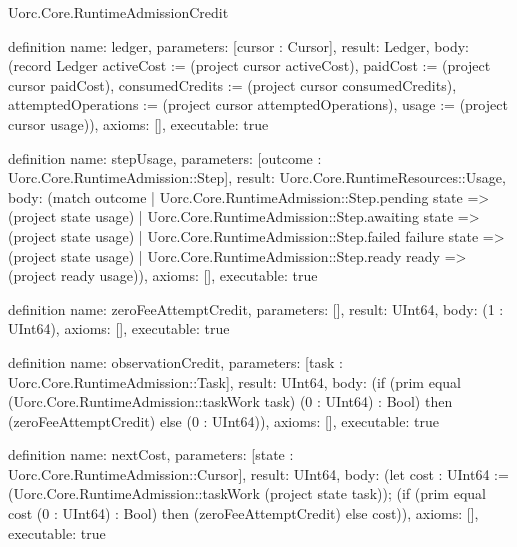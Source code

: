 \begin{lexlean}{Uorc.Core.RuntimeAdmissionCredit}
\begin{semanticmodule}
definition{
  name: ledger,
  parameters: [cursor : Cursor],
  result: Ledger,
  body: (record Ledger {activeCost := (project cursor activeCost), paidCost := (project cursor paidCost), consumedCredits := (project cursor consumedCredits), attemptedOperations := (project cursor attemptedOperations), usage := (project cursor usage)}),
  axioms: [],
  executable: true
}

definition{
  name: stepUsage,
  parameters: [outcome : Uorc.Core.RuntimeAdmission::Step],
  result: Uorc.Core.RuntimeResources::Usage,
  body: (match outcome
    | Uorc.Core.RuntimeAdmission::Step.pending state => (project state usage)
    | Uorc.Core.RuntimeAdmission::Step.awaiting state => (project state usage)
    | Uorc.Core.RuntimeAdmission::Step.failed failure state => (project state usage)
    | Uorc.Core.RuntimeAdmission::Step.ready ready => (project ready usage)),
  axioms: [],
  executable: true
}

definition{
  name: zeroFeeAttemptCredit,
  parameters: [],
  result: UInt64,
  body: (1 : UInt64),
  axioms: [],
  executable: true
}

definition{
  name: observationCredit,
  parameters: [task : Uorc.Core.RuntimeAdmission::Task],
  result: UInt64,
  body: (if (prim equal (Uorc.Core.RuntimeAdmission::taskWork task) (0 : UInt64) : Bool) then (zeroFeeAttemptCredit) else (0 : UInt64)),
  axioms: [],
  executable: true
}

definition{
  name: nextCost,
  parameters: [state : Uorc.Core.RuntimeAdmission::Cursor],
  result: UInt64,
  body: (let cost : UInt64 := (Uorc.Core.RuntimeAdmission::taskWork (project state task)); (if (prim equal cost (0 : UInt64) : Bool) then (zeroFeeAttemptCredit) else cost)),
  axioms: [],
  executable: true
}


\end{semanticmodule}
\end{lexlean}
